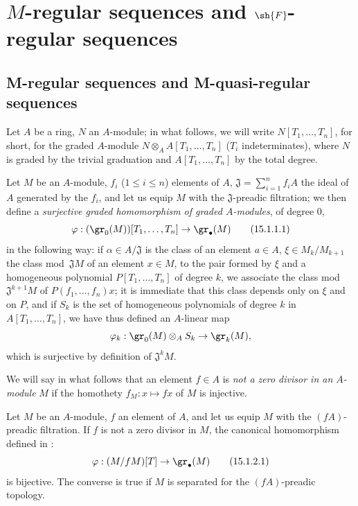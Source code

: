 \section{\texorpdfstring{$M$}{M}-regular sequences and \texorpdfstring{$\sh{F}$}{F}-regular sequences}
\label{section:0.15}

\subsection{M-regular sequences and M-quasi-regular sequences}
\label{subsection:0.15.1}

\begin{env}[15.1.1]
\label{0.15.1.1}
Let $A$ be a ring, $N$ an $A$-module;
in what follows, we will write $N[T_1,\ldots,T_n]$, for short, for the graded $A$-module $N\otimes_A A[T_1,\ldots,T_n]$ ($T_i$ indeterminates), where $N$ is graded by the trivial graduation and $A[T_1,\ldots,T_n]$ by the total degree.

Let $M$ be an $A$-module, $f_i$ ($1\leq i\leq n$) elements of $A$, $\mathfrak{J}=\sum_{i=1}^n f_iA$ the ideal of $A$ generated by the $f_i$, and let us equip $M$ with the $\mathfrak{J}$-preadic filtration;
we then define a \emph{surjective graded homomorphism of graded $A$-modules}, of degree $0$,
\[
\label{0.15.1.1.1}
  \varphi : (\gr_0(M))[T_1,\ldots,T_n] \to \gr_\bullet(M)
\tag{15.1.1.1}
\]
in the following way:
if $\alpha\in A/\mathfrak{J}$ is the class of an element $a\in A$, $\xi\in M_k/M_{k+1}$ the class mod~$\mathfrak{J}M$ of an element $x\in M$, to the pair formed by $\xi$ and a homogeneous polynomial $P[T_1,\ldots,T_n]$ of degree $k$, we associate the class mod~$\mathfrak{J}^{k+1}M$ of $P(f_1,\ldots,f_n)x$;
it is immediate that this class depends only on $\xi$ and on $P$, and if $S_k$ is the set of homogeneous polynomials of degree $k$ in $A[T_1,\ldots,T_n]$, we have thus defined an $A$-linear map
\[
  \varphi_k : \gr_0(M)\otimes_A S_k \to \gr_k(M),
\]
which is surjective by definition of $\mathfrak{J}^k M$.

We will say in what follows that an element $f\in A$ is \emph{not a zero divisor in an $A$-module} $M$ if the homothety $f_M:x\mapsto fx$ of $M$ is injective.
\end{env}

\begin{lemma}[15.1.2]
\label{0.15.1.2}
Let $M$ be an $A$-module, $f$ an element of $A$, and let us equip $M$ with the $(fA)$-preadic filtration.
If $f$ is not a zero divisor in $M$, the canonical homomorphism defined in :
\[
\label{0.15.1.2.1}
  \varphi : (M/fM)[T] \to \gr_\bullet(M)
\tag{15.1.2.1}
\]
is bijective.
The converse is true if $M$ is separated for the $(fA)$-preadic topology.
\end{lemma}

